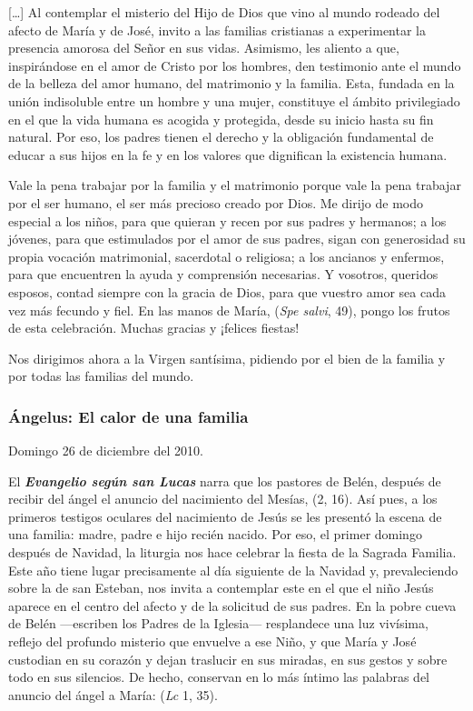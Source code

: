 [\ldots{}] Al contemplar el misterio del Hijo de Dios que vino al mundo rodeado del afecto de María y de José, invito a las familias cristianas a experimentar la presencia amorosa del Señor en sus vidas. Asimismo, les aliento a que, inspirándose en el amor de Cristo por los hombres, den testimonio ante el mundo de la belleza del amor humano, del matrimonio y la familia. Esta, fundada en la unión indisoluble entre un hombre y una mujer, constituye el ámbito privilegiado en el que la vida humana es acogida y protegida, desde su inicio hasta su fin natural. Por eso, los padres tienen el derecho y la obligación fundamental de educar a sus hijos en la fe y en los valores que dignifican la existencia humana.

Vale la pena trabajar por la familia y el matrimonio porque vale la pena trabajar por el ser humano, el ser más precioso creado por Dios. Me dirijo de modo especial a los niños, para que quieran y recen por sus padres y hermanos; a los jóvenes, para que estimulados por el amor de sus padres, sigan con generosidad su propia vocación matrimonial, sacerdotal o religiosa; a los ancianos y enfermos, para que encuentren la ayuda y comprensión necesarias. Y vosotros, queridos esposos, contad siempre con la gracia de Dios, para que vuestro amor sea cada vez más fecundo y fiel. En las manos de María,  (\emph{Spe salvi}, 49), pongo los frutos de esta celebración. Muchas gracias y ¡felices fiestas!

Nos dirigimos ahora a la Virgen santísima, pidiendo por el bien de la familia y por todas las familias del mundo.

\subsubsection{Ángelus: El calor de una familia}

Domingo 26 de diciembre del 2010.

El \emph{\textbf{Evangelio según san Lucas}} narra que los pastores de Belén, después de recibir del ángel el anuncio del nacimiento del Mesías,  (2, 16). Así pues, a los primeros testigos oculares del nacimiento de Jesús se les presentó la escena de una familia: madre, padre e hijo recién nacido. Por eso, el primer domingo después de Navidad, la liturgia nos hace celebrar la fiesta de la Sagrada Familia. Este año tiene lugar precisamente al día siguiente de la Navidad y, prevaleciendo sobre la de san Esteban, nos invita a contemplar este  en el que el niño Jesús aparece en el centro del afecto y de la solicitud de sus padres. En la pobre cueva de Belén ---escriben los Padres de la Iglesia--- resplandece una luz vivísima, reflejo del profundo misterio que envuelve a ese Niño, y que María y José custodian en su corazón y dejan traslucir en sus miradas, en sus gestos y sobre todo en sus silencios. De hecho, conservan en lo más íntimo las palabras del anuncio del ángel a María:  (\emph{Lc} 1, 35).

